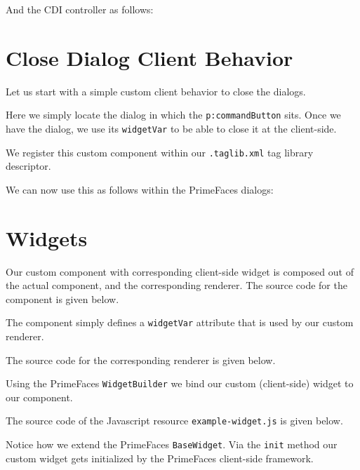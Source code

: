 And the CDI controller as follows:


\section{Close Dialog Client Behavior}
Let us start with a simple custom client behavior to close the dialogs.

Here we simply locate the dialog in which the \texttt{p:commandButton} sits.
Once we have the dialog, we use its \texttt{widgetVar} to be able to close it at the client-side.

We register this custom component within our \texttt{.taglib.xml} tag library descriptor.


We can now use this as follows within the PrimeFaces dialogs:



\section{Widgets}
Our custom component with corresponding client-side widget is composed out of the actual component, and the corresponding renderer.
The source code for the component is given below.

The component simply defines a \texttt{widgetVar} attribute that is used by our custom renderer.

The source code for the corresponding renderer is given below.

Using the PrimeFaces \texttt{WidgetBuilder} we bind our custom (client-side) widget to our component.

The source code of the Javascript resource \texttt{example-widget.js} is given below.

Notice how we extend the PrimeFaces \texttt{BaseWidget}. Via the \texttt{init} method our custom widget gets initialized by the PrimeFaces client-side framework.

